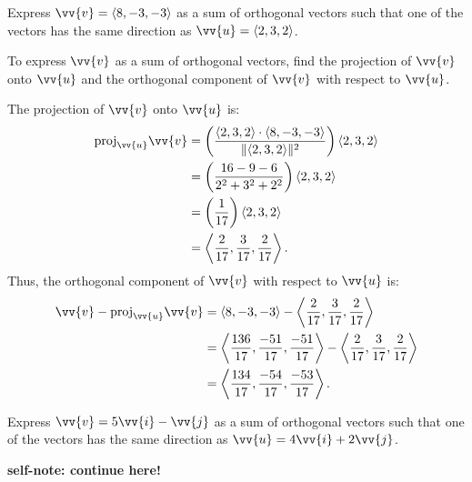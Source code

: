 \documentclass{article}
\begin{document}
\begin{examplebox}
    Express \(\vv{v} = \langle 8, -3, -3 \rangle\) as a sum of orthogonal vectors such that one of the vectors has the same direction as \(\vv{u} = \langle 2, 3, 2 \rangle\).

    \begin{solutionbox}
        \begin{conceptbox}
            To express \(\vv{v}\) as a sum of orthogonal vectors, find the projection of \(\vv{v}\) onto \(\vv{u}\) and the orthogonal component of \(\vv{v}\) with respect to \(\vv{u}\).
        \end{conceptbox}
        The projection of \(\vv{v}\) onto \(\vv{u}\) is:
        \begin{align*}
            \text{proj}_{\vv{u}} \vv{v} &= \left( \frac{\langle 2, 3, 2 \rangle \cdot \langle 8, -3, -3 \rangle}{\|\langle 2, 3, 2 \rangle\|^2} \right) \langle 2, 3, 2 \rangle \\
            &= \left( \frac{16 - 9 - 6}{2^2 + 3^2 + 2^2} \right) \langle 2, 3, 2 \rangle \\
            &= \left( \frac{1}{17} \right) \langle 2, 3, 2 \rangle \\
            &= \left\langle \frac{2}{17}, \frac{3}{17}, \frac{2}{17} \right\rangle.
        \end{align*}
        Thus, the orthogonal component of \(\vv{v}\) with respect to \(\vv{u}\) is:
        \begin{align*}
            \vv{v} - \text{proj}_{\vv{u}} \vv{v} &= \langle 8, -3, -3 \rangle - \left\langle \frac{2}{17}, \frac{3}{17}, \frac{2}{17} \right\rangle \\
            &= \left\langle \frac{136}{17}, \frac{-51}{17}, \frac{-51}{17} \right\rangle - \left\langle \frac{2}{17}, \frac{3}{17}, \frac{2}{17} \right\rangle \\
            &= \left\langle \frac{134}{17}, \frac{-54}{17}, \frac{-53}{17} \right\rangle.
        \end{align*}
    \end{solutionbox}
\end{examplebox}

\begin{exercisebox}
    Express \(\vv{v} = 5\vv{i} - \vv{j}\) as a sum of orthogonal vectors such that one of the vectors has the same direction as \(\vv{u} = 4\vv{i} + 2\vv{j}\).
\end{exercisebox}

\textbf{self-note: continue here!}
\end{document}
